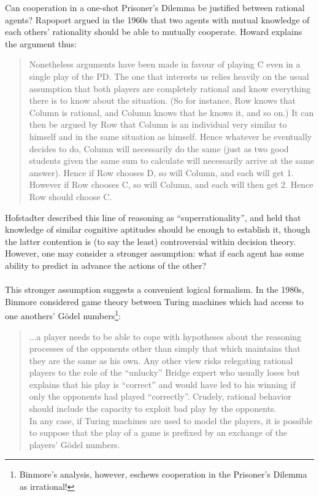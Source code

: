 \documentclass[12pt, letterpaper]{article}
\numberwithin{equation}{section}
\begin{document}
Can cooperation in a one-shot Prisoner's Dilemma be justified between rational agents? Rapoport \cite{Rapoport} argued in the 1960s that two agents with mutual knowledge of each others' rationality should be able to mutually cooperate. Howard \cite{Howard} explains the argument thus: \begin{quote} Nonetheless arguments have been made in favour of playing C even in a single play of the PD. The one that interests us relies heavily on the usual assumption that both players are completely rational and know everything there is to know about the situation. (So for instance, Row knows that Column is rational, and Column knows that he knows it, and so on.) It can then be argued by Row that Column is an individual very similar to himself and in the same situation as himself. Hence whatever he eventually decides to do, Column will necessarily do the same (just as two good students given the same sum to calculate will necessarily arrive at the same answer). Hence if Row chooses D, so will Column, and each will get 1. However if Row chooses C, so will Column, and each will then get 2. Hence Row should choose C.\end{quote} Hofstadter \cite{Metamagical} described this line of reasoning as ``superrationality'', and held that knowledge of similar cognitive aptitudes should be enough to establish it, though the latter contention is (to say the least) controversial within decision theory. However, one may consider a stronger assumption: what if each agent has some ability to predict in advance the actions of the other? 
\\
\\ This stronger assumption suggests a convenient logical formalism. In the 1980s, Binmore \cite{Binmore} considered game theory between Turing machines which had access to one anothers' G\"{o}del numbers\footnote{Binmore's analysis, however, eschews cooperation in the Prisoner's Dilemma as irrational!}: \begin{quote} ...a player needs to be able to cope with hypotheses about the reasoning processes of the opponents other than simply that which maintains that they are the same as his own. Any other view risks relegating rational players to the role of the ``unlucky'' Bridge expert who usually loses but explains that his play is ``correct'' and would have led to his winning if only the opponents had played ``correctly''. Crudely, rational behavior should include the capacity to exploit bad play by the opponents. \\ In any case, if Turing machines are used to model the players, it is possible to suppose that the play of a game is prefixed by an exchange of the players' G\"{o}del numbers.\end{quote}
\end{document}

